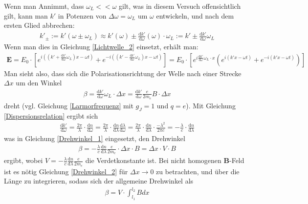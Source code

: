 \documentclass[12pt,a4paper]{article}
\begin{document}
Wenn man Annimmt, dass $\omega_L << \omega$ gilt, was in diesem Versuch offensichtlich gilt, kann man $k'$ in Potenzen von $\Delta \omega = \omega_L$
um $\omega$ entwickeln, und nach dem ersten Glied abbrechen:
\begin{align*}
k'_{\pm} := k'(\omega \pm \omega_L) \approx k'(\omega) \pm \frac{\text{d} k'}{\text{d} \omega}(\omega)\cdot\omega_L := k' \pm \frac{\text{d}k'}{\text{d}\omega}\omega_L
\end{align*}
Wenn man dies in Gleichung \ref{Lichtwelle_2} einsetzt, erhält man:
\begin{align}
\textbf{E} = E_0\cdot[e^{i((k'+ \frac{\text{d} k'}{\text{d} \omega}\omega_L) x - \omega t)}+e^{-i((k' - \frac{\text{d} k'}{\text{d} \omega}\omega_L) x - \omega t)}] = E_0\cdot[e^{i\frac{\text{d} k'}{\text{d} \omega}\omega_L \cdot x}(e^{i(k' x - \omega t)}+e^{-i(k' x - \omega t)})]
\label{Lichtwelle_3}
\end{align}
Man sieht also, dass sich die Polarisationsrichtung der Welle nach einer Strecke $\Delta x$ um den Winkel
\begin{align}
\beta = \frac{\text{d} k'}{\text{d} \omega}\omega_L\cdot \Delta x = \frac{\text{d} k'}{\text{d} \omega}\frac{e}{2m_e}B\cdot \Delta x
\label{Drehwinkel_1}
\end{align}
dreht (vgl. Gleichung \ref{Larmorfrequenz} mit $g_J = 1$ und $ q = e $).
Mit Gleichung \ref{Dispersionsrelation} ergibt sich
\begin{align}
\frac{\text{d} k'}{\text{d} \omega} = \frac{2\pi}{\lambda}\cdot\frac{\text{d} n}{\text{d} \omega} = \frac{2\pi}{\lambda}\cdot\frac{\text{d} n}{\text{d} \lambda}\frac{\text{d} \lambda}{\text{d} \omega} = \frac{2\pi}{\lambda}\cdot \frac{\text{d} n}{\text{d} \lambda} \cdot \frac{-\lambda^2}{2\pi c} = -\frac{\lambda}{c} \cdot \frac{\text{d} n}{\text{d} \lambda}
\end{align}
was in Gleichung \ref{Drehwinkel_1} eingesetzt, den Drehwinkel
\begin{align}
\beta = -\frac{\lambda}{c} \frac{\text{d} n}{\text{d} \lambda}\frac{e}{2m_e}\cdot\Delta x\cdot B = \Delta x \cdot V \cdot B
\label{Drehwinkel_2}
\end{align}
ergibt, wobei $V =  -\frac{\lambda}{c} \frac{\text{d} n}{\text{d} \lambda}\frac{e}{2m_e}$ die Verdetkonstante ist.
Bei nicht homogenen \textbf{B}-Feld ist es nötig Gleichung \ref{Drehwinkel_2} für $\Delta x \rightarrow 0$ zu betrachten, und über die Länge zu integrieren, sodass sich der allgemeine Drehwinkel als
\begin{align}
\beta = V \cdot \int_{l_1}^{l_2} B dx
\end{align}
\end{document}
